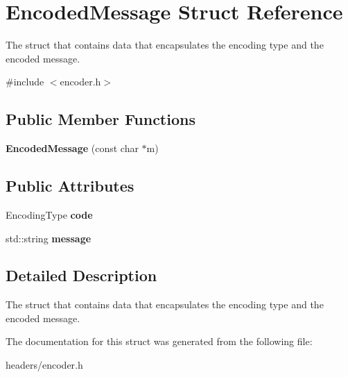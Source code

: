 \section{Encoded\+Message Struct Reference}
\label{struct_encoded_message}


The struct that contains data that encapsulates the encoding type and the encoded message.  




{\ttfamily \#include $<$encoder.\+h$>$}

\subsection*{Public Member Functions}
\begin{DoxyCompactItemize}
\item 
\mbox{\label{struct_encoded_message_a5993f82f3db6caff8924f5031b266f09}} 
{\bfseries Encoded\+Message} (const char $\ast$m)
\end{DoxyCompactItemize}
\subsection*{Public Attributes}
\begin{DoxyCompactItemize}
\item 
\mbox{\label{struct_encoded_message_ab1b733ac5585e8ce61b81812e11c240f}} 
Encoding\+Type {\bfseries code}
\item 
\mbox{\label{struct_encoded_message_acfd5bc4448b8a2e3761d8c4a3995489a}} 
std\+::string {\bfseries message}
\end{DoxyCompactItemize}


\subsection{Detailed Description}
The struct that contains data that encapsulates the encoding type and the encoded message. 

The documentation for this struct was generated from the following file\+:\begin{DoxyCompactItemize}
\item 
headers/encoder.\+h\end{DoxyCompactItemize}
